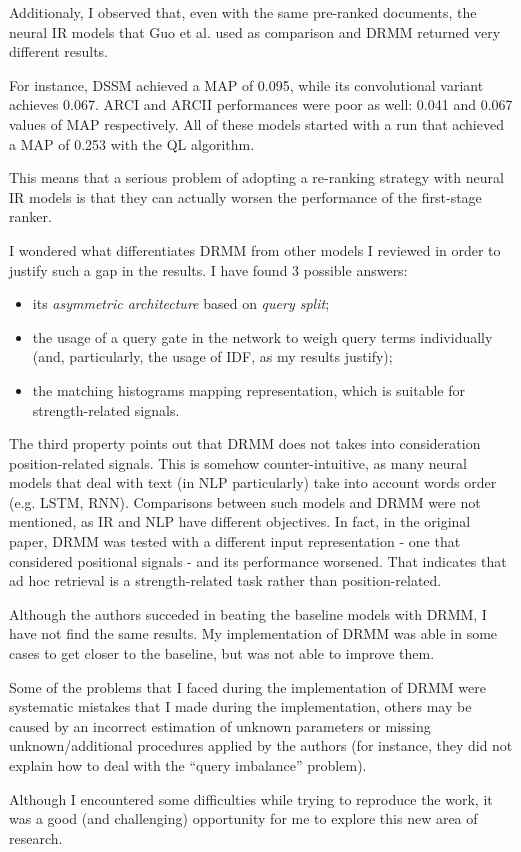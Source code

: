 Additionaly, I observed that, even with the same pre-ranked documents, the neural IR models that Guo et al. used as comparison and DRMM returned very different results.

For instance, DSSM achieved a MAP of 0.095, while its convolutional variant achieves 0.067. ARCI and ARCII performances were poor as well: 0.041 and 0.067 values of MAP respectively. All of these models started with a run that achieved a MAP of 0.253 with the QL algorithm.

This means that a serious problem of adopting a re-ranking strategy with neural IR models is that they can actually worsen the performance of the first-stage ranker.

I wondered what differentiates DRMM from other models I reviewed in order to justify such a gap in the results. I have found 3 possible answers:

\begin{itemize}
    \item its \textit{asymmetric architecture} based on \textit{query split};
    \item the usage of a query gate in the network to weigh query terms individually (and, particularly, the usage of IDF, as my results justify);
    \item the matching histograms mapping representation, which is suitable for strength-related signals.
\end{itemize}

The third property points out that DRMM does not takes into consideration position-related signals. This is somehow counter-intuitive, as many neural models that deal with text (in NLP particularly) take into account words order (e.g. LSTM, RNN). Comparisons between such models and DRMM were not mentioned, as IR and NLP have different objectives. In fact, in the original paper, DRMM was tested with a different input representation - one that considered positional signals - and its performance worsened. That indicates that ad hoc retrieval is a strength-related task rather than position-related.

Although the authors succeded in beating the baseline models with DRMM, I have not find the same results. My implementation of DRMM was able in some cases to get closer to the baseline, but was not able to improve them.

Some of the problems that I faced during the implementation of DRMM were systematic mistakes that I made during the implementation, others may be caused by an incorrect estimation of unknown parameters or missing unknown/additional procedures applied by the authors (for instance, they did not explain how to deal with the ``query imbalance'' problem).

Although I encountered some difficulties while trying to reproduce the work, it was a good (and challenging) opportunity for me to explore this new area of research.
